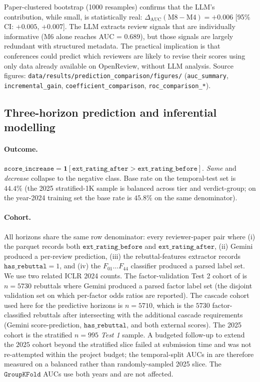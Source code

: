 \documentclass{article}
\newcommand{\code}[1]{\texttt{#1}}
\begin{document}
Paper-clustered bootstrap (1000 resamples) confirms that the LLM's contribution, while small, is statistically real: $\Delta_{\text{AUC}}(\text{M8} - \text{M4}) = +0.006$ [95\% CI: $+0.005$, $+0.007$]. The LLM extracts review signals that are individually informative (M6 alone reaches AUC = 0.689), but those signals are largely redundant with structured metadata. The practical implication is that conferences could predict which reviewers are likely to revise their scores using only data already available on OpenReview, without LLM analysis. Source figures: \code{data/results/prediction\_comparison/figures/} (\code{auc\_summary}, \code{incremental\_gain}, \code{coefficient\_comparison}, \code{roc\_comparison\_*}).

\subsection{Three-horizon prediction and inferential modelling}\label{app:horizons}

\paragraph{Outcome.} $\code{score\_increase} = \mathbf{1}[\code{ext\_rating\_after} > \code{ext\_rating\_before}]$. \emph{Same} and \emph{decrease} collapse to the negative class. Base rate on the temporal-test set is $44.4\%$ (the 2025 stratified-1K sample is balanced across tier and verdict-group; on the year-2024 training set the base rate is $45.8\%$ on the same denominator).

\paragraph{Cohort.} All horizons share the same row denominator: every reviewer-paper pair where (i) the parquet records both $\code{ext\_rating\_before}$ and $\code{ext\_rating\_after}$, (ii) Gemini produced a per-review prediction, (iii) the rebuttal-features extractor records $\code{has\_rebuttal} = 1$, and (iv) the $F_{01}\ldots F_{44}$ classifier produced a parsed label set. We use two related ICLR 2024 counts. The factor-validation Test 2 cohort of  is $n = \num{5730}$ rebuttals where Gemini produced a parsed factor label set (the disjoint validation set on which per-factor odds ratios are reported). The cascade cohort used here for the predictive horizons is $n = \num{5710}$, which is the $\num{5730}$ factor-classified rebuttals after intersecting with the additional cascade requirements (Gemini score-prediction, $\code{has\_rebuttal}$, and both external scores). The 2025 cohort is the stratified $n=995$ \emph{Test 1} sample. A budgeted follow-up to extend the $2025$ cohort beyond the stratified slice failed at submission time and was not re-attempted within the project budget; the temporal-split AUCs in  are therefore measured on a balanced rather than randomly-sampled 2025 slice. The $\texttt{GroupKFold}$ AUCs use both years and are not affected.
\end{document}
